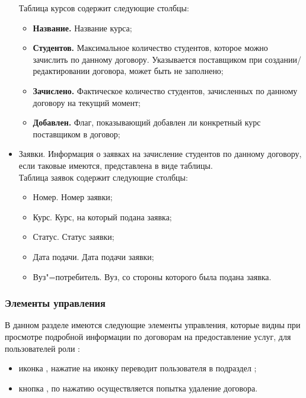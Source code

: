 \begin{itemize}
	Таблица курсов содержит следующие столбцы:
	\begin{itemize}
		\item \textbf{Название.} Название курса;
		\item \textbf{Студентов.} Максимальное количество студентов, которое можно зачислить по данному договору. Указывается поставщиком при создании/редактировании договора, может быть не заполнено;
		\item\textbf{ Зачислено.} Фактическое количество студентов, зачисленных по данному договору на текущий момент;
		\item \textbf{Добавлен.} Флаг, показывающий добавлен ли конкретный курс поставщиком в договор;
	\end{itemize}	
	\item Заявки. Информация о заявках на зачисление студентов по данному договору, если таковые имеются, представлена в виде таблицы.\\
	Таблица заявок содержит следующие столбцы:
	\begin{itemize}
		\item Номер. Номер заявки;
		\item Курс. Курс, на который подана заявка;
		\item Статус. Статус заявки;
		\item Дата подачи. Дата подачи заявки;
		\item Вуз"=потребитель. Вуз, со стороны которого была подана заявка.
	\end{itemize}
\end{itemize}

\subsubsection{Элементы управления}
В данном разделе имеются следующие элементы управления, которые видны при просмотре подробной информации по договорам на предоставление услуг, для пользователей роли :
\begin{itemize}
	\item иконка , нажатие на иконку переводит пользователя в подраздел ;
	\item кнопка , по нажатию осуществляется попытка удаление договора.
\end{itemize}

